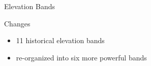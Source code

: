 \begin{frame}{Elevation Bands}

\begin{block}{Changes}
	\begin{itemize}
		\item 11 historical elevation bands
		\item re-organized into six	more powerful bands	
	\end{itemize}
\end{block}
			

		
\end{frame}